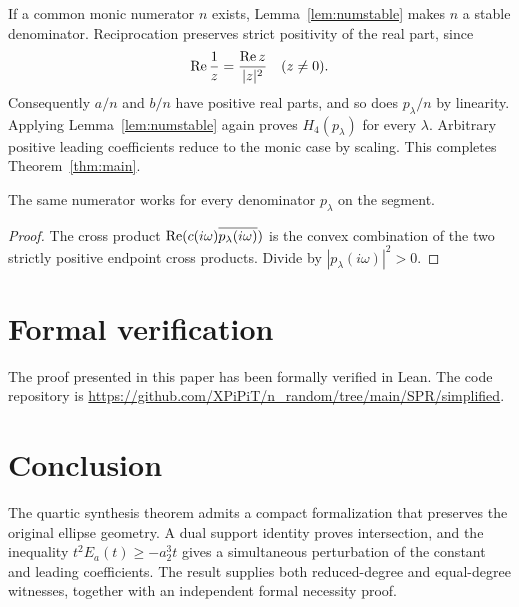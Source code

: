 \documentclass[11pt]{article}
\begin{document}
If a common monic numerator $n$ exists, Lemma~\ref{lem:numstable} makes $n$ a stable denominator. Reciprocation preserves strict positivity of the real part, since
\[
 \operatorname{Re}\frac1z=\frac{\operatorname{Re} z}{|z|^2}\quad(z\ne0).
\]
Consequently $a/n$ and $b/n$ have positive real parts, and so does $p_\lambda/n$ by linearity. Applying Lemma~\ref{lem:numstable} again proves $H_4(p_\lambda)$ for every $\lambda$. Arbitrary positive leading coefficients reduce to the monic case by scaling. This completes Theorem~\ref{thm:main}.

\begin{corollary}
The same numerator works for every denominator $p_\lambda$ on the segment.
\end{corollary}
\begin{proof}
The cross product $\operatorname{Re}(c(i\omega)\overline{p_\lambda(i\omega)})$ is the convex combination of the two strictly positive endpoint cross products. Divide by $|p_\lambda(i\omega)|^2>0$.
\end{proof}

\section{Formal verification}
The proof presented in this paper has been formally verified in Lean. The code repository is \url{https://github.com/XPiPiT/n_random/tree/main/SPR/simplified}.

\section{Conclusion}
The quartic synthesis theorem admits a compact formalization that preserves the original ellipse geometry. A dual support identity proves intersection, and the inequality $t^2E_a(t)\ge-a_2^3t$ gives a simultaneous perturbation of the constant and leading coefficients. The result supplies both reduced-degree and equal-degree witnesses, together with an independent formal necessity proof.



\end{document}

